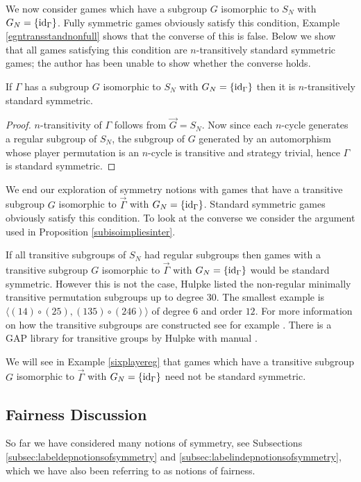 We now consider games which have a subgroup $G$ isomorphic to $S_N$ with $G_N = \{\text{id}_{\Gamma}\}$. Fully symmetric games obviously satisfy this condition, Example \ref{egntransstandnonfull} shows that the converse of this is false. Below we show that all games satisfying this condition are $n$-transitively standard symmetric games; the author has been unable to show whether the converse holds.

\begin{proposition} \label{subisoimpliesinter}
	If $\Gamma$ has a subgroup $G$ isomorphic to $S_N$ with $G_N = \{\text{id}_{\Gamma}\}$ then it is $n$-transitively standard symmetric. 
	\begin{proof}
		$n$-transitivity of $\Gamma$ follows from $\overrightarrow{G} = S_N$. Now since each $n$-cycle generates a regular subgroup of $S_N$, the subgroup of $G$ generated by an automorphism whose player permutation is an $n$-cycle is transitive and strategy trivial, hence $\Gamma$ is standard symmetric.
	\end{proof}
\end{proposition}

We end our exploration of symmetry notions with games that have a transitive subgroup $G$ isomorphic to $\overrightarrow{\Gamma}$ with $G_N = \{\text{id}_{\Gamma}\}$. Standard symmetric games obviously satisfy this condition. To look at the converse we consider the argument used in Proposition \ref{subisoimpliesinter}. 

If all transitive subgroups of $S_N$ had regular subgroups then games with a transitive subgroup $G$ isomorphic to $\overrightarrow{\Gamma}$ with $G_N = \{\text{id}_{\Gamma}\}$ would be standard symmetric. However this is not the case, Hulpke \cite{hulpke2005constructing} listed the non-regular minimally transitive permutation subgroups up to degree $30$. The smallest example is $\langle (14) \circ (25), (135) \circ (246)\rangle$ of degree $6$ and order $12$. For more information on how the transitive subgroups are constructed see for example \cite[Algorithm 8.1]{hulpke2016connected}. There is a GAP \cite{GAP4} library for transitive groups by Hulpke with manual \cite{hulpketransgrp}.

We will see in Example \ref{sixplayereg} that games which have a transitive subgroup $G$ isomorphic to $\overrightarrow{\Gamma}$ with $G_N = \{\text{id}_{\Gamma}\}$ need not be standard symmetric. 

\subsection{Fairness Discussion} \label{subsec:fairnessdiscussion}
So far we have considered many notions of symmetry, see Subsections \ref{subsec:labeldepnotionsofsymmetry} and \ref{subsec:labelindepnotionsofsymmetry}, which we have also been referring to as notions of fairness. 

